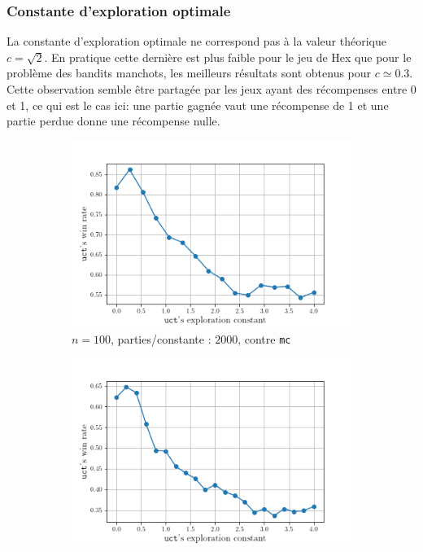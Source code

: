 \documentclass[a4paper]{article}
\theoremstyle{definition}
\begin{document}
\subsubsection{Constante d'exploration optimale}

La constante d'exploration optimale ne correspond pas à la valeur théorique $c=\sqrt{2}$. En pratique cette dernière est plus faible pour le jeu de Hex que pour le problème des bandits manchots, les meilleurs résultats sont obtenus pour $c \simeq 0.3$. Cette observation semble être partagée par les jeux ayant des récompenses entre 0 et 1, ce qui est le cas ici: une partie gagnée vaut une récompense de 1 et une partie perdue donne une récompense nulle.

\begin{figure}[!h]
	\centering
	\begin{subfigure}{0.32\textwidth}
		\centering
		\includegraphics[width=\textwidth]{test1.png}
		\caption{$n=100$, parties/constante : $2000$, contre \texttt{mc}}
		\label{fig:1_}
	\end{subfigure}
	\hfill
	\begin{subfigure}{0.32\textwidth}
		\centering
		\includegraphics[width=\textwidth]{test2.png}

\end{subfigure}
\end{figure}
\end{document}
